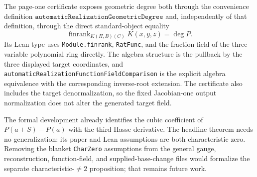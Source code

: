 The page-one certificate exposes geometric degree both through the
convenience definition
\(\texttt{automaticRealizationGeometricDegree}\) and, independently of that
definition, through the direct standard-object equality
\[
 \operatorname{finrank}_{K(\Pi,B)(C)}K(x,y,z)
 =\deg P.
\]
Its Lean type uses \texttt{Module.finrank}, \texttt{RatFunc}, and the fraction
field of the three-variable polynomial ring directly.  The algebra structure
is the pullback by the three displayed target coordinates, and
\nolinkurl{automaticRealizationFunctionFieldComparison} is the explicit
algebra equivalence with the corresponding inverse-root extension.
The certificate also includes the target denormalization, so the fixed
Jacobian-one output normalization does not alter the generated target field.

The formal development already identifies the cubic coefficient of
\(P(a+S)-P(a)\) with the third Hasse derivative.  The headline theorem needs
no generalization: its paper and Lean assumptions are both characteristic
zero.  Removing the blanket \texttt{CharZero} assumptions from the general
gauge, reconstruction, function-field, and supplied-base-change files would
formalize the separate characteristic-\(\ne2\) proposition; that remains
future work.
